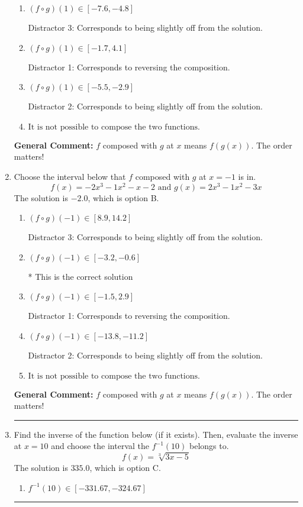 \documentclass{extbook}[14pt]
\newcommand{\litem}[1]{\item #1

\rule{\textwidth}{0.4pt}}
\begin{document}
\begin{enumerate}
{\begin{enumerate}[label=\Alph*.]
* This is the correct solution
\item \( (f \circ g)(1) \in [-7.6, -4.8] \)

 Distractor 3: Corresponds to being slightly off from the solution.
\item \( (f \circ g)(1) \in [-1.7, 4.1] \)

 Distractor 1: Corresponds to reversing the composition.
\item \( (f \circ g)(1) \in [-5.5, -2.9] \)

 Distractor 2: Corresponds to being slightly off from the solution.
\item \( \text{It is not possible to compose the two functions.} \)


\end{enumerate}

\textbf{General Comment:} $f$ composed with $g$ at $x$ means $f(g(x))$. The order matters!
}
\litem{
Choose the interval below that $f$ composed with $g$ at $x=-1$ is in.
\[ f(x) = -2x^{3} -1 x^{2} -x -2 \text{ and } g(x) = 2x^{3} -1 x^{2} -3 x \]The solution is \( -2.0 \), which is option B.\begin{enumerate}[label=\Alph*.]
\item \( (f \circ g)(-1) \in [8.9, 14.2] \)

 Distractor 3: Corresponds to being slightly off from the solution.
\item \( (f \circ g)(-1) \in [-3.2, -0.6] \)

* This is the correct solution
\item \( (f \circ g)(-1) \in [-1.5, 2.9] \)

 Distractor 1: Corresponds to reversing the composition.
\item \( (f \circ g)(-1) \in [-13.8, -11.2] \)

 Distractor 2: Corresponds to being slightly off from the solution.
\item \( \text{It is not possible to compose the two functions.} \)


\end{enumerate}

\textbf{General Comment:} $f$ composed with $g$ at $x$ means $f(g(x))$. The order matters!
}
\litem{
Find the inverse of the function below (if it exists). Then, evaluate the inverse at $x = 10$ and choose the interval the $f^{-1}(10)$ belongs to.
\[ f(x) = \sqrt[3]{3 x - 5} \]The solution is \( 335.0 \), which is option C.\begin{enumerate}[label=\Alph*.]
\item \( f^{-1}(10) \in [-331.67, -324.67] \)


\end{enumerate}}
\end{enumerate}
\end{document}
